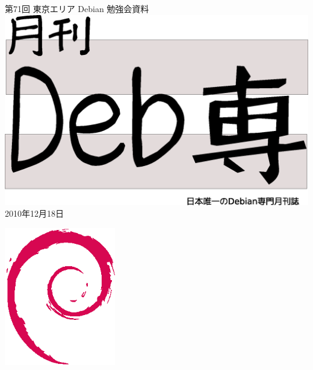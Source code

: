 \documentclass[mingoth,a4paper]{jsarticle}
\newcommand{\debmtgyear}{2010}
\newcommand{\debmtgmonth}{12}
\newcommand{\debmtgdate}{18}
\newcommand{\debmtgnumber}{71}
\begin{document}
\begin{titlepage}
\thispagestyle{empty}

\vspace*{-2cm}
第\debmtgnumber{}回 東京エリア Debian 勉強会資料\\
\hspace*{-2cm}
\includegraphics[width=210mm]{image201003/debsen.eps}\\
\hfill{}\debmtgyear{}年\debmtgmonth{}月\debmtgdate{}日



\vspace*{-2cm}
\hfill{}\includegraphics[height=6cm]{image200502/openlogo-nd.eps}
\end{titlepage}

\end{document}
